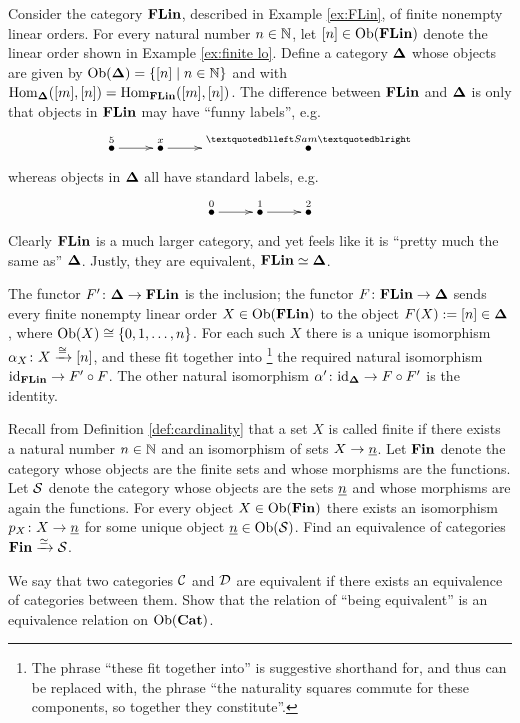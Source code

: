 \begin{example}\label{ex:finite linear orders}

Consider the category ${\bf FLin}$, described in Example \ref{ex:FLin}, of finite nonempty linear orders. For every natural number $n\in{\mathbb N}$, let $[n]\in\textnormal{Ob}({\bf FLin})$ denote the linear order shown in Example \ref{ex:finite lo}. Define a category ${\bf \Delta}$ whose objects are given by $\textnormal{Ob}({\bf \Delta})=\{[n]{\;|\;}n\in{\mathbb N}\}$ and with $\textnormal{Hom}_{{\bf \Delta}}([m],[n])=\textnormal{Hom}_{{\bf FLin}}([m],[n])$. The difference between ${\bf FLin}$ and ${\bf \Delta}$ is only that objects in ${\bf FLin}$ may have “funny labels”, e.g. 
$$\xymatrix{\LMO{5}\ar[r]&\LMO{x}\ar[r]&\LMO{“Sam”}}$$ 
whereas objects in ${\bf \Delta}$ all have standard labels, e.g.
$$\xymatrix{\LMO{0}\ar[r]&\LMO{1}\ar[r]&\LMO{2}}$$
Clearly ${\bf FLin}$ is a much larger category, and yet feels like it is “pretty much the same as” ${\bf \Delta}$. Justly, they are equivalent, ${\bf FLin}\simeq{\bf \Delta}$. 

The functor $F'\colon{\bf \Delta}\rightarrow{\bf FLin}$ is the inclusion; the functor $F\colon{\bf FLin}\rightarrow{\bf \Delta}$ sends every finite nonempty linear order $X\in\textnormal{Ob}({\bf FLin})$ to the object $F(X):=[n]\in{\bf \Delta}$, where $\textnormal{Ob}(X)\cong\{0,1,\ldots,n\}$. For each such $X$ there is a unique isomorphism $\alpha_X\colon X\xrightarrow{\cong}[n]$, and these fit together into
\footnote{The phrase “these fit together into” is suggestive shorthand for, and thus can be replaced with, the phrase “the naturality squares commute for these components, so together they constitute”.}
the required natural isomorphism $\textnormal{id}_{{\bf FLin}}\rightarrow F'\circ F$. The other natural isomorphism $\alpha'\colon\textnormal{id}_{{\bf \Delta}}\rightarrow F\circ F'$ is the identity.

\end{example}

\begin{exercise}
Recall from Definition \ref{def:cardinality} that a set $X$ is called finite if there exists a natural number $n\in{\mathbb N}$ and an isomorphism of sets $X\rightarrow\underline{n}$. Let ${\bf Fin}$ denote the category whose objects are the finite sets and whose morphisms are the functions. Let $\mathcal{S}$ denote the category whose objects are the sets $\underline{n}$ and whose morphisms are again the functions. For every object $X\in\textnormal{Ob}({\bf Fin})$ there exists an isomorphism $p_X\colon X\rightarrow\underline{n}$ for some unique object $\underline{n}\in\textnormal{Ob}(\mathcal{S})$. Find an equivalence of categories ${\bf Fin}\xrightarrow{\simeq}\mathcal{S}$. 
\end{exercise}

\begin{exercise}
We say that two categories $\mathcal{C}$ and $\mathcal{D}$ are equivalent if there exists an equivalence of categories between them. Show that the relation of “being equivalent” is an equivalence relation on $\textnormal{Ob}({\bf Cat})$.
\end{exercise}


